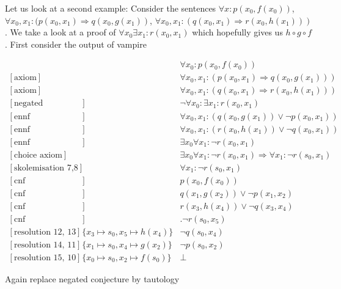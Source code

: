 \documentclass[onehalfspacing]{article}
\theoremstyle{definition}
\theoremstyle{definition}
\theoremstyle{definition}
\theoremstyle{definition}
\theoremstyle{definition}
\theoremstyle{definition}
\begin{document}
Let us look at a second example: Consider the sentences $\forall x : p(x_0, f(x_0))$, $\forall x_0, x_1: (p(x_0, x_1)\Rightarrow q(x_0, g(x_1))$, $\forall x_0, x_1: (q(x_0, x_1)\Rightarrow r(x_0, h(x_1)))$. We take a look at a proof of $\forall x_0\exists x_1: r(x_0, x_1)$ which hopefully gives us $h\circ g\circ f$. First consider the output of vampire

\setcounter{equation}{0}
\begin{align}
	[\text{axiom}] && \forall x_0: p(x_0,f(x_0))\\
	[\text{axiom}] && \forall x_0, x_1 : (p(x_0,x_1) \Rightarrow q(x_0,g(x_1)))\\
	[\text{axiom}] && \forall x_0, x_1 : (q(x_0,x_1) \Rightarrow r(x_0,h(x_1)))\\
	[\text{negated conjecture}] &&\neg\forall  x_0 : \exists x_1 : r(x_0,x_1)\\
	[\text{ennf transformation 2}] && \forall x_0, x_1 : (q(x_0,g(x_1)) \vee \neg p(x_0,x_1)) \\
	[\text{ennf transformation 3}] &&\forall x_0, x_1 : (r(x_0,h(x_1)) \vee \neg q(x_0, x_1)) \\
	[\text{ennf transformation 4}] && \exists x_0 \forall x_1 : \neg r(x_0, x_1)\\
	[\text{choice axiom}] && \exists x_0 \forall x_1 : \neg r(x_0, x_1) \Rightarrow \forall x_1 : \neg r(s_0,x_1)\\
	[\text{skolemisation 7,8}] && \forall x_1 : \neg r(s_0, x_1)\\
	[\text{cnf transformation 1}] && p(x_0,f(x_0))\\
	[\text{cnf transformation 5}] && q(x_1,g(x_2)) \vee \neg p(x_1, x_2)\\
	[\text{cnf transformation 6}] && r(x_3,h(x_4)) \vee \neg q(x_3, x_4)\\
	[\text{cnf transformation 9}] &&. \neg r(s_0,x_5)\\
	[\text{resolution 12, 13}] &\{x_3\mapsto s_0, x_5\mapsto h(x_4)\}& \neg q(s_0,x_4)\\
	[\text{resolution 14, 11}] &\{x_1\mapsto s_0, x_4\mapsto g(x_2)\}&\neg p(s_0,x_2)\\
	[\text{resolution 15, 10}] &\{x_0\mapsto s_0, x_2\mapsto f(s_0)\}& \bot
\end{align}

Again replace negated conjecture by tautology
\end{document}
